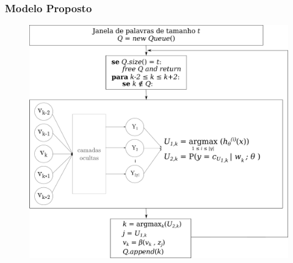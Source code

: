 \documentclass[10pt]{beamer}
\begin{document}
\begin{frame}[fragile]
\frametitle{Modelo Proposto}
\vspace{-0.75em}


  \begin{figure}
      \begin{center}
        \includegraphics[scale=0.15]{img/neuralnetworkfinal_alg2.pdf}
      \end{center}
    \end{figure}

\end{frame}
\end{document}
